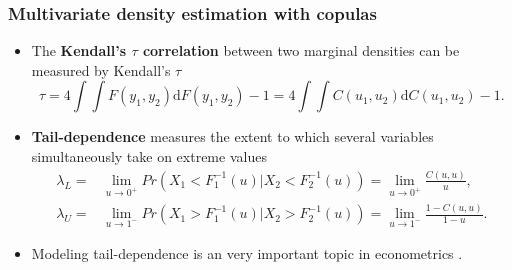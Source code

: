 \documentclass[11pt]{beamer}
\begin{document}
\begin{frame}
  \frametitle{Multivariate density estimation with copulas}

  \begin{itemize}
  \item The \textbf{Kendall's $\tau$ correlation} between two marginal
    densities can be measured by Kendall's $\tau$
    \[
    \tau=4\int\int F(y_{1},y_{2})\mathrm{d}F(y_{1},y_{2})-1=4\int\int
    C(u_{1},u_{2})\mathrm{d}C(u_{1},u_{2})-1.
    \]

  \item \textbf{Tail-dependence} measures the extent to which
    several variables simultaneously take on extreme values
    \[
    \begin{split}\lambda_{L}= & \lim\limits _{u\to0^{+}}Pr(X_{1}<F_{1}^{-1}(u)|X_{2}<F_{2}^{-1}(u))=\lim\limits _{u\to0^{+}}\frac{C(u,u)}{u},\\
      \lambda_{U}= & \lim\limits _{u\to1^{-}}Pr(X_{1}>F_{1}^{-1}(u)|X_{2}>F_{2}^{-1}(u))=\lim\limits _{u\to1^{-}}\frac{1-C(u,u)}{1-u}.
    \end{split}
    \]

  \item Modeling tail-dependence is an very important topic in econometrics
    \citep{joe1997multivariate} \citep{patton2012review}.

  \end{itemize}



\end{frame}
\end{document}
